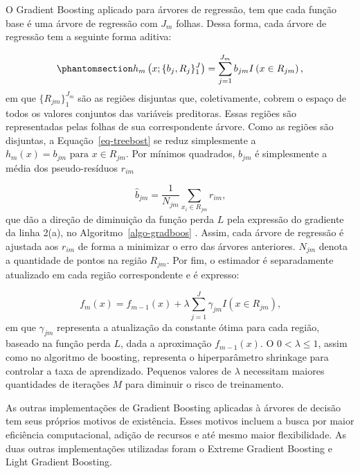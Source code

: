 \documentclass[
  12pt,
  a4paper,
]{scrreprt}
\begin{document}
\vspace{12pt}

O Gradient Boosting aplicado para árvores de regressão, tem que cada
função base é uma árvore de regressão com \(J_m\) folhas. Dessa forma,
cada árvore de regressão tem a seguinte forma aditiva:

\begin{equation}\phantomsection\label{eq-treebost}{
h_m\left(x;\{b_j, R_j\}^J_{1}\right) = \sum^{J_m}_{j = 1} b_{jm} I\left(x \in R_{jm}\right)\text{,}
}\end{equation} em que \(\{R_{jm}\}^{J_m}_{1}\) são as regiões disjuntas
que, coletivamente, cobrem o espaço de todos os valores conjuntos das
variáveis preditoras. Essas regiões são representadas pelas folhas de
sua correspondente árvore. Como as regiões são disjuntas, a
Equação~\ref{eq-treebost} se reduz simplesmente a
\(h_m\left(x\right) = b_{jm}\text{ para } x \in  R_{jm}\). Por mínimos
quadrados, \(b_{jm}\) é simplesmente a média dos pseudo-resíduos
\(r_{im}\)

\[
\hat{b}_{jm} = \frac{1}{N_{jm}} \sum_{x_i \in R_{jm}} r_{im}\text{,}
\] que dão a direção de diminuição da função perda \(L\) pela expressão
do gradiente da linha 2(a), no  Algoritmo~\ref{algo-gradboos} . Assim,
cada árvore de regressão é ajustada aos \(r_{im}\) de forma a minimizar
o erro das árvores anteriores. \(N_{jm}\) denota a quantidade de pontos
na região \(R_{jm}\). Por fim, o estimador é separadamente atualizado em
cada região correspondente e é expresso:

\[
f_m\left(x\right) = f_{m - 1}\left(x\right) + \lambda \sum^{J}_{j = 1} \gamma_{jm} I\left(x \in R_{jm}\right)\text{,}
\] em que \(\gamma_{jm}\) representa a atualização da constante ótima
para cada região, baseado na função perda \(L\), dada a aproximação
\(f_{m-1}\left(x\right)\). O \(0 < \lambda \leq 1\), assim como no
algoritmo de boosting, representa o hiperparâmetro shrinkage para
controlar a taxa de aprendizado. Pequenos valores de \(\lambda\)
necessitam maiores quantidades de iterações \(M\) para diminuir o risco
de treinamento.

\vspace{12pt}

As outras implementações de Gradient Boosting aplicadas à árvores de
decisão tem seus próprios motivos de existência. Esses motivos incluem a
busca por maior eficiência computacional, adição de recursos e até mesmo
maior flexibilidade. As duas outras implementações utilizadas foram o
Extreme Gradient Boosting e Light Gradient Boosting.
\end{document}
